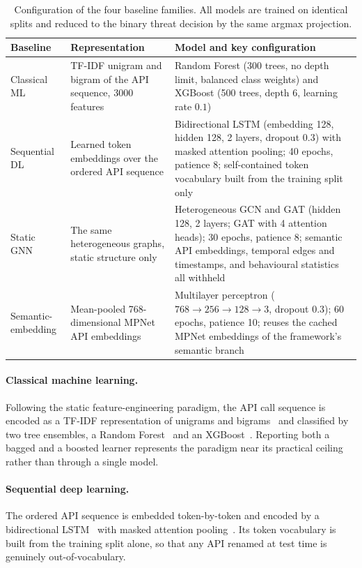 \documentclass[%
    BCOR=10mm,
    DIV=13,
    toc=bibliography,
    toc=listof,
    oneside,
    12pt,
]{scrbook}
\begin{document}
\begin{table}[htbp]
\centering
\small
\caption[Baseline family configurations]{Configuration of the four baseline families. All models are trained on
identical splits and reduced to the binary threat decision by the same argmax
projection.}
\label{tab:baseline_config}
\begin{tabular}{@{}l p{3.1cm} p{6.4cm}@{}}
\toprule
\textbf{Baseline} & \textbf{Representation} & \textbf{Model and key configuration} \\
\midrule
Classical ML &
TF-IDF unigram and bigram of the API sequence, 3000 features &
Random Forest (300 trees, no depth limit, balanced class weights) and XGBoost
(500 trees, depth 6, learning rate $0.1$) \\
\addlinespace
Sequential DL &
Learned token embeddings over the ordered API sequence &
Bidirectional LSTM (embedding 128, hidden 128, 2 layers, dropout $0.3$) with
masked attention pooling; 40 epochs, patience 8; self-contained token
vocabulary built from the training split only \\
\addlinespace
Static GNN &
The same heterogeneous graphs, static structure only &
Heterogeneous GCN and GAT (hidden 128, 2 layers; GAT with 4 attention heads);
30 epochs, patience 8; semantic API embeddings, temporal edges and timestamps,
and behavioural statistics all withheld \\
\addlinespace
Semantic-embedding &
Mean-pooled 768-dimensional MPNet API embeddings &
Multilayer perceptron ($768\rightarrow256\rightarrow128\rightarrow3$, dropout
$0.3$); 60 epochs, patience 10; reuses the cached MPNet embeddings of the
framework's semantic branch \\
\bottomrule
\end{tabular}
\end{table}

\paragraph{Classical machine learning.} Following the static feature-engineering
paradigm, the API call sequence is encoded as a TF-IDF representation of unigrams
and bigrams~\cite{salton1988tfidf} and classified by two tree ensembles, a
Random Forest~\cite{breiman2001random} and an
XGBoost~\cite{chen2016xgboost}. Reporting both a bagged and a boosted
learner represents the paradigm near its practical ceiling rather than through a
single model.

\paragraph{Sequential deep learning.} The ordered API sequence is embedded
token-by-token and encoded by a bidirectional LSTM~\cite{hochreiter1997} with
masked attention pooling~\cite{bahdanau2015attention}. Its token vocabulary is
built from the training split alone, so that any API renamed at test time is
genuinely out-of-vocabulary.
\end{document}
